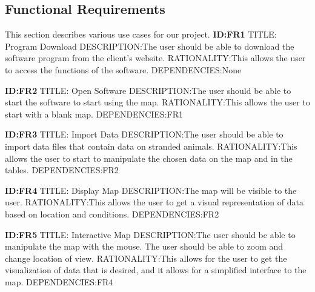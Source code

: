 \documentclass[onecolumn, draftclsnofoot,10pt, compsoc]{IEEEtran}
\begin{document}
\begin{singlespace}
\subsection{Functional Requirements}
    This section describes various use cases for our project. \newline\newline
    \textbf{ID:FR1}\newline
    TITLE: Program Download\newline
    DESCRIPTION:The user should be able to download the software program from the client's website.\newline
    RATIONALITY:This allows the user to access the functions of the software.\newline
    DEPENDENCIES:None\newline
    
    \textbf{ID:FR2}\newline
    TITLE: Open Software\newline
    DESCRIPTION:The user should be able to start the software to start using the map.\newline
    RATIONALITY:This allows the user to start with a blank map.\newline
    DEPENDENCIES:FR1\newline

    \textbf{ID:FR3}\newline
    TITLE: Import Data\newline
    DESCRIPTION:The user should be able to import data files that contain data on stranded animals.\newline
    RATIONALITY:This allows the user to start to manipulate the chosen data on the map and in the tables.\newline
    DEPENDENCIES:FR2\newline

    \textbf{ID:FR4}\newline
    TITLE: Display Map\newline
    DESCRIPTION:The map will be visible to the user.\newline
    RATIONALITY:This allows the user to get a visual representation of data based on location and conditions.\newline
    DEPENDENCIES:FR2\newline

    \textbf{ID:FR5}\newline
    TITLE: Interactive Map\newline
    DESCRIPTION:The user should be able to manipulate the map with the mouse.  The user should be able to zoom and change location of view.\newline
    RATIONALITY:This allows for the user to get the visualization of data that is desired, and it allows for a simplified interface to the map.\newline
    DEPENDENCIES:FR4\newline


\end{singlespace}
\end{document}
